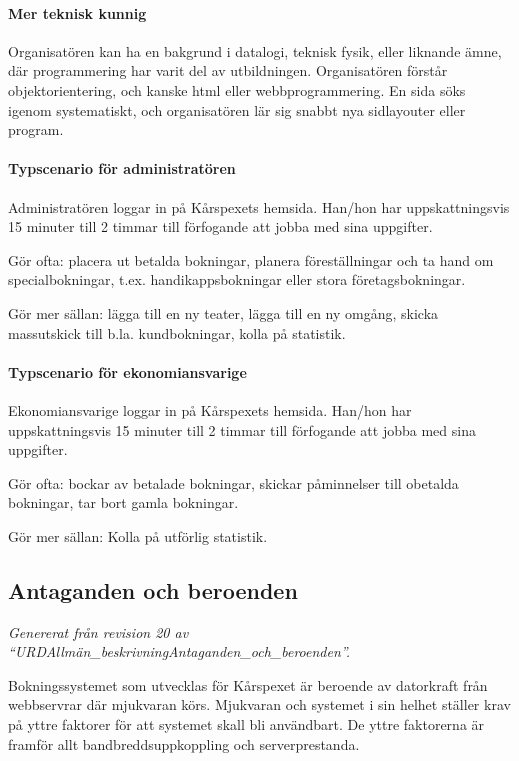 \documentclass[a4paper, twoside, 11pt, titlepage]{article}
\begin{document}
			\paragraph{Mer teknisk kunnig}

			Organisatören kan ha en bakgrund i datalogi, teknisk fysik, eller liknande ämne, där programmering har varit del av utbildningen. Organisatören förstår objektorientering, och kanske html eller webbprogrammering. En sida söks igenom systematiskt, och organisatören lär sig snabbt nya sidlayouter eller program.

			\paragraph{Typscenario för administratören}

			Administratören loggar in på Kårspexets hemsida. Han/hon har uppskattningsvis 15 minuter till 2 timmar till förfogande att jobba med sina uppgifter. 

			Gör ofta: placera ut betalda bokningar, planera föreställningar och ta hand om specialbokningar, t.ex. handikappsbokningar eller stora företagsbokningar. 

			Gör mer sällan: lägga till en ny teater, lägga till en ny omgång, skicka massutskick till b.la. kundbokningar, kolla på statistik.

			\paragraph{Typscenario för ekonomiansvarige}

			Ekonomiansvarige loggar in på Kårspexets hemsida. Han/hon har uppskattningsvis 15 minuter till 2 timmar till förfogande att jobba med sina uppgifter.

			Gör ofta: bockar av betalade bokningar, skickar påminnelser till obetalda bokningar, tar bort gamla bokningar.

			Gör mer sällan: Kolla på utförlig statistik.

	\subsection{Antaganden och beroenden}


	\emph{Genererat från revision 20 av ``URDAllmän\_beskrivningAntaganden\_och\_beroenden''.}

	Bokningssystemet som utvecklas för Kårspexet är beroende av datorkraft från webbservrar där mjukvaran körs. Mjukvaran och systemet i sin helhet ställer krav på yttre faktorer för att systemet skall bli användbart. De yttre faktorerna är framför allt bandbreddsuppkoppling och serverprestanda.
\end{document}

